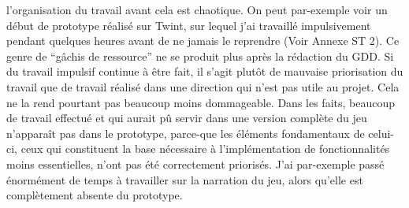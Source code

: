 \documentclass{scrartcl}
\begin{document}
l'organisation du travail avant cela est chaotique. On peut par-exemple voir un début de prototype réalisé sur Twint, sur lequel j'ai travaillé impulsivement pendant quelques heures avant de ne jamais le reprendre (Voir Annexe ST 2). Ce genre de “gâchis de ressource” ne se produit plus après la rédaction du GDD. Si du travail impulsif continue à être fait, il s'agit plutôt de mauvaise priorisation du travail que de travail réalisé dans une direction qui n'est pas utile au projet. Cela ne la rend pourtant pas beaucoup moins dommageable. Dans les faits, beaucoup de travail effectué et qui aurait pû servir dans une version complète du jeu n'apparaît pas dans le prototype, parce-que les éléments fondamentaux de celui-ci, ceux qui constituent la base nécessaire à l'implémentation de fonctionnalités moins essentielles, n'ont pas été correctement priorisés. J'ai par-exemple passé énormément de temps à travailler sur la narration du jeu, alors qu'elle est complètement absente du prototype.\\
	
\end{document}
